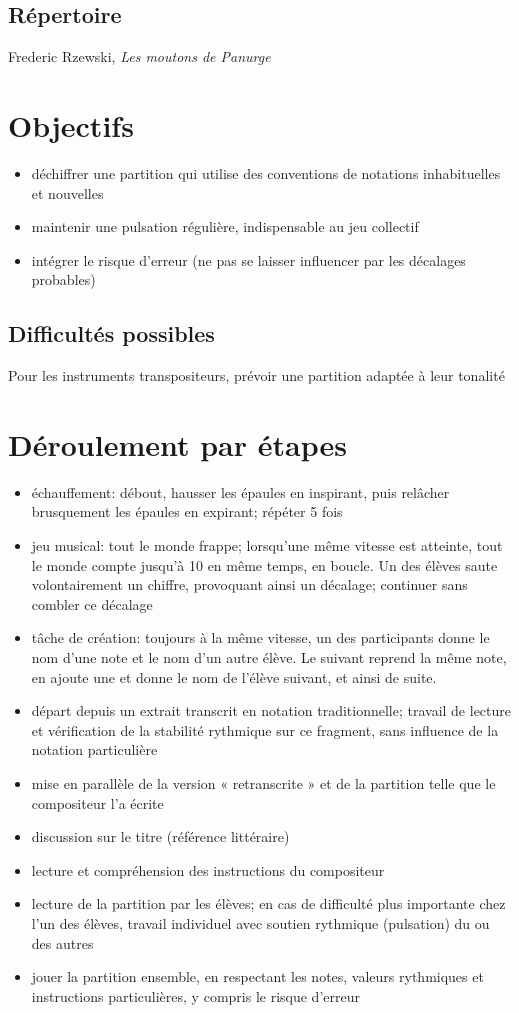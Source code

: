 \documentclass[a4paper,11pt,bibliography=totoc,numbers=noenddot,listof=flat,DIV=11,BCOR=0mm]{scrreprt}%
\begin{document}
\subsection*{Répertoire}
Frederic Rzewski, \emph{Les moutons de Panurge}

\section*{Objectifs}
\begin{itemize}
\item déchiffrer une partition qui utilise des conventions de notations inhabituelles et nouvelles
\item maintenir une pulsation régulière, indispensable au jeu collectif
\item intégrer le risque d'erreur (ne pas se laisser influencer par les décalages probables)
\end{itemize}

\subsection*{Difficultés possibles}
Pour les instruments transpositeurs, prévoir une partition adaptée à leur tonalité

\section*{Déroulement par étapes}
\begin{itemize}
\item échauffement: débout, hausser les épaules en inspirant, puis relâcher brusquement les épaules en expirant; répéter 5 fois
\item jeu musical: tout le monde frappe; lorsqu'une même vitesse est atteinte, tout le monde compte jusqu'à 10 en même temps, en boucle. Un des élèves saute volontairement un chiffre, provoquant ainsi un décalage; continuer sans combler ce décalage
\item tâche de création: toujours à la même vitesse, un des participants donne le nom d'une note et le nom d'un autre élève. Le suivant reprend la même note, en ajoute une et donne le nom de l'élève suivant, et ainsi de suite.
\item départ depuis un extrait transcrit en notation traditionnelle; travail de lecture et vérification de la stabilité rythmique sur ce fragment, sans influence de la notation particulière
\item mise en parallèle de la version « retranscrite » et de la partition telle que le compositeur l’a écrite
\item discussion sur le titre (référence littéraire)
\item lecture et compréhension des instructions du compositeur
\item lecture de la partition par les élèves; en cas de difficulté plus importante chez l’un des  élèves, travail individuel avec soutien rythmique (pulsation) du ou des autres
\item jouer la partition ensemble, en respectant les notes, valeurs rythmiques et instructions particulières, y compris le risque d’erreur
\end{itemize}
\end{document}
